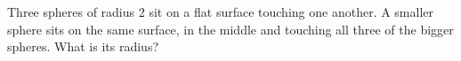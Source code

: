Three spheres of radius 2 sit on a flat surface touching one another. A smaller sphere sits on the same surface, in the middle and touching all three of the bigger spheres. What is its radius?
